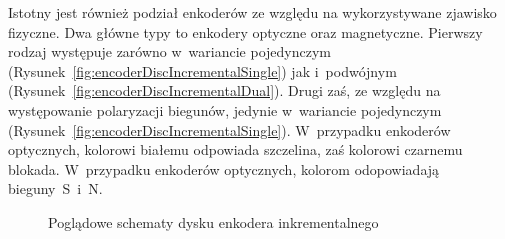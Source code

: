 Istotny jest również podział enkoderów ze względu na wykorzystywane zjawisko fizyczne. Dwa główne typy to enkodery optyczne oraz magnetyczne. Pierwszy rodzaj występuje zarówno w~wariancie pojedynczym (Rysunek~\ref{fig:encoderDiscIncrementalSingle}) jak i~podwójnym (Rysunek~\ref{fig:encoderDiscIncrementalDual}). Drugi zaś, ze względu na występowanie polaryzacji biegunów, jedynie w~wariancie pojedynczym (Rysunek~\ref{fig:encoderDiscIncrementalSingle}). W~przypadku enkoderów optycznych, kolorowi białemu odpowiada szczelina, zaś kolorowi czarnemu blokada. W~przypadku enkoderów optycznych, kolorom odopowiadają bieguny~S~i~N.

\begin{figure}
    \centering
    \qquad
    \caption{Poglądowe schematy dysku enkodera inkrementalnego \cite{bib:tarczeenkoderowinkrementalnych}}
\end{figure}